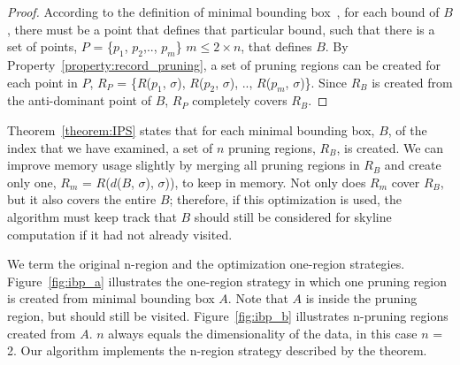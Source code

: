 \begin{proof}
According to the definition of minimal bounding box~\cite{DBLP:journals/gis/PapadiasT97}, for each bound of $B$, there must be a point that defines that particular bound, such that there is a set of points, $P$ = \{$p_1$, $p_2$,.., $p_m$\} $m \leq 2 \times n$, that defines $B$. By Property~\ref{property:record_pruning}, a set of pruning regions can be created for each point in $P$, $R_P$ = \{$R$($p_1$, $\sigma$), $R$($p_2$, $\sigma$), .., $R$($p_m$, $\sigma$)\}. Since $R_B$ is created from the anti-dominant point of $B$, $R_P$ completely covers $R_B$.
\end{proof}
%
%

Theorem~\ref{theorem:IPS} states that for each minimal bounding box, $B$, of the index that we have examined, a set of $n$ pruning regions, $R_B$, is created. We can improve memory usage slightly by merging all pruning regions in $R_B$ and create only one, $R_m$ = $R$($d$($B$, $\sigma$), $\sigma$)), to keep in memory. Not only does $R_m$ cover $R_B$, but it also covers the entire $B$; therefore, if this optimization is used, the algorithm must keep track that $B$ should still be considered for skyline computation if it had not already visited.

We term the original n-region and the optimization one-region strategies. Figure~\ref{fig:ibp_a} illustrates the one-region strategy in which one pruning region is created from minimal bounding box $A$. Note that $A$ is inside the pruning region, but should still be visited. Figure~\ref{fig:ibp_b} illustrates n-pruning regions created from $A$. $n$ always equals the dimensionality of the data, in this case $n$ = 2. Our algorithm implements the n-region strategy described by the theorem.

